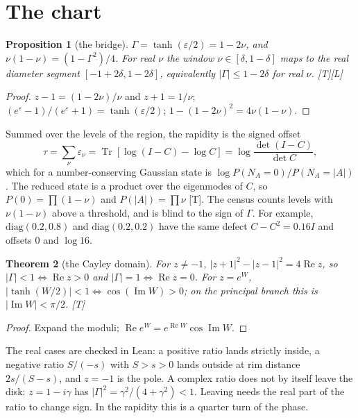 \documentclass[11pt]{article}
\newtheorem{theorem}{Theorem}[section]
\newtheorem{proposition}[theorem]{Proposition}
\theoremstyle{definition}
\newcommand{\grade}[1]{\textsf{\small[#1]}}
\newcommand{\Tr}{\operatorname{Tr}}
\newcommand{\Rea}{\operatorname{Re}}
\newcommand{\Ima}{\operatorname{Im}}
\begin{document}
\section{The chart}\label{sec:chart}
\begin{proposition}[the bridge]\label{prop:bridge}
$\Gamma=\tanh(\varepsilon/2)=1-2\nu$, and $\nu(1-\nu)=(1-\Gamma^2)/4$. For real $\nu$ the window $\nu\in[\delta,1-\delta]$ maps to the real diameter segment $[-1+2\delta,1-2\delta]$, equivalently $|\Gamma|\le1-2\delta$ for real $\nu$. \grade{T}\grade{L}
\end{proposition}
\begin{proof}
$z-1=(1-2\nu)/\nu$ and $z+1=1/\nu$; $(e^\varepsilon-1)/(e^\varepsilon+1)=\tanh(\varepsilon/2)$; $1-(1-2\nu)^2=4\nu(1-\nu)$.
\end{proof}
Summed over the levels of the region, the rapidity is the signed offset
\begin{equation}\label{eq:offset}
\tau=\sum_\nu\varepsilon_\nu=\Tr[\log(I-C)-\log C]=\log\frac{\det(I-C)}{\det C},
\end{equation}
which for a number-conserving Gaussian state is $\log P(N_A=0)/P(N_A=|A|)$. The reduced state is a product over the eigenmodes of $C$, so $P(0)=\prod(1-\nu)$ and $P(|A|)=\prod\nu$ \grade{T}. The census counts levels with $\nu(1-\nu)$ above a threshold, and is blind to the sign of $\Gamma$. For example, $\mathrm{diag}(0.2,0.8)$ and $\mathrm{diag}(0.2,0.2)$ have the same defect $C-C^2=0.16I$ and offsets $0$ and $\log16$.

\begin{theorem}[the Cayley domain]\label{thm:cayley}
For $z\ne-1$, $|z+1|^2-|z-1|^2=4\Rea z$, so $|\Gamma|<1\iff\Rea z>0$ and $|\Gamma|=1\iff\Rea z=0$. For $z=e^W$, $|\tanh(W/2)|<1\iff\cos(\Ima W)>0$; on the principal branch this is $|\Ima W|<\pi/2$. \grade{T}
\end{theorem}
\begin{proof}
Expand the moduli; $\Rea e^W=e^{\Rea W}\cos\Ima W$.
\end{proof}
The real cases are checked in Lean: a positive ratio lands strictly inside, a negative ratio $S/(-s)$ with $S>s>0$ lands outside at rim distance $2s/(S-s)$, and $z=-1$ is the pole. A complex ratio does not by itself leave the disk: $z=1-i\gamma$ has $|\Gamma|^2=\gamma^2/(4+\gamma^2)<1$. Leaving needs the real part of the ratio to change sign. In the rapidity this is a quarter turn of the phase.
\end{document}
